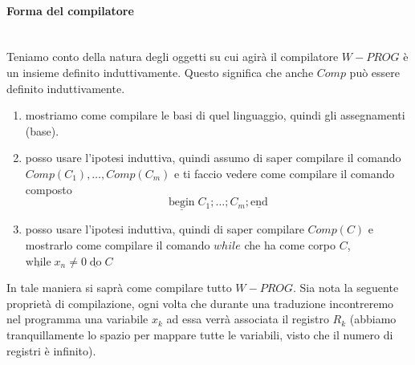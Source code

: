 \documentclass{article}
\begin{document}
\paragraph{Forma del compilatore}\mbox{}\\
Teniamo conto della natura degli oggetti su cui agirà il compilatore $W-PROG$ è un insieme definito
induttivamente. Questo significa che anche $Comp$ può essere definito induttivamente.
\begin{enumerate}
    \item mostriamo come compilare le basi di quel linguaggio, quindi gli assegnamenti (base).
    \item posso usare l'ipotesi induttiva, quindi assumo di saper compilare il comando $Comp(C_1),\dots,Comp(C_m)$ e ti
          faccio vedere come compilare il comando composto
          $$\underline{\text{begin}}\;C_1;\dots ;C_m; \underline{\text{end}}$$
    \item posso usare l'ipotesi induttiva, quindi di saper compilare $Comp(C)$ e mostrarlo come compilare il comando
          $while$ che ha come corpo $C$, $\underline{\text{while}}\;x_n\neq 0\;\underline{\text{do}}\;C$
\end{enumerate}
In tale maniera si saprà come compilare tutto $W-PROG$. Sia nota la seguente proprietà di compilazione,
ogni volta che durante una traduzione incontreremo nel programma una variabile $x_k$ ad essa verrà
associata il registro $R_k$ (abbiamo tranquillamente lo spazio per mappare tutte le variabili, visto
che il numero di registri è infinito).
\end{document}

